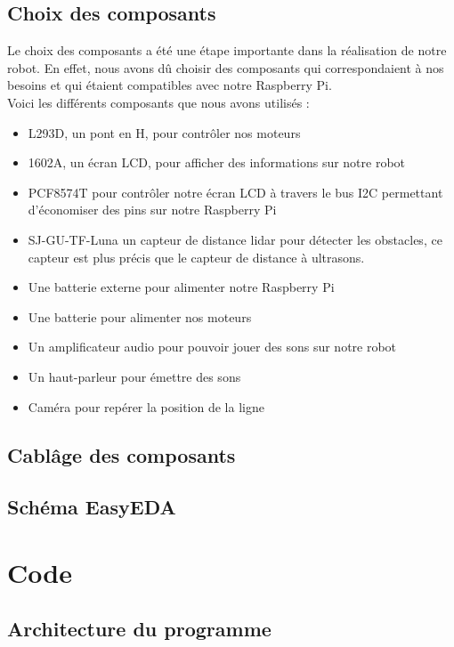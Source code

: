 \documentclass[a4paper, 12pt]{report}
\begin{document}
\subsection{Choix des composants}
Le choix des composants a été une étape importante dans la réalisation de notre robot. En effet, nous avons dû choisir des composants qui correspondaient à nos besoins et qui étaient compatibles avec notre Raspberry Pi. 
\\
Voici les différents composants que nous avons utilisés :
\begin{itemize}
    \item L293D, un pont en H, pour contrôler nos moteurs
    \item 1602A, un écran LCD, pour afficher des informations sur notre robot
    \item PCF8574T pour contrôler notre écran LCD à travers le bus I2C permettant d'économiser des pins sur notre Raspberry Pi
    \item SJ-GU-TF-Luna un capteur de distance lidar pour détecter les obstacles, ce capteur est plus précis que le capteur de distance à ultrasons.
    \item Une batterie externe pour alimenter notre Raspberry Pi
    \item Une batterie pour alimenter nos moteurs
    \item Un amplificateur audio pour pouvoir jouer des sons sur notre robot
    \item Un haut-parleur pour émettre des sons
    \item Caméra pour repérer la position de la ligne
\end{itemize}

\subsection{Cablâge des composants}
\subsection{Schéma EasyEDA}
\section{Code}
\subsection{Architecture du programme}
\end{document}
